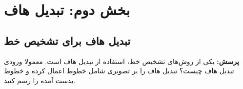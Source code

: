 \documentclass[12pt,a4paper]{article}
\theoremstyle{definition}
\theoremstyle{theorem}
\theoremstyle{definition}
\begin{document}
\vspace{0.2cm}
\begin{center}
\vspace{0.5cm}
\end{center}

\vspace{0.5cm}
\section{ بخش دوم: تبدیل هاف} 
\vspace{0.5cm}
\subsection{تبدیل هاف برای تشخیص خط}

\textbf{پرسش: }
 یکی از روش‌های تشخیص خط، استفاده از تبدیل هاف است. معمولا ورودی تبدیل هاف چیست؟ تبدیل هاف را بر تصویری شامل خطوط اعمال کرده و خطوط بدست آمده را رسم کنید.
\end{document}
